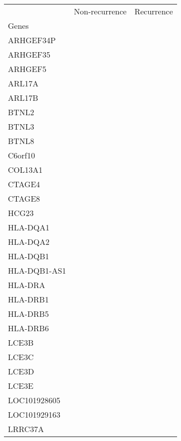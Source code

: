 \begin{tabular}{lcc}
\toprule
{} & Non-recurrence & Recurrence \\
Genes        &                &            \\
\midrule
ARHGEF34P    &                &            \\
ARHGEF35     &                &            \\
ARHGEF5      &                &            \\
ARL17A       &                &            \\
ARL17B       &                &            \\
BTNL2        &                &            \\
BTNL3        &                &            \\
BTNL8        &                &            \\
C6orf10      &                &            \\
COL13A1      &                &            \\
CTAGE4       &                &            \\
CTAGE8       &                &            \\
HCG23        &                &            \\
HLA-DQA1     &                &            \\
HLA-DQA2     &                &            \\
HLA-DQB1     &                &            \\
HLA-DQB1-AS1 &                &            \\
HLA-DRA      &                &            \\
HLA-DRB1     &                &            \\
HLA-DRB5     &                &            \\
HLA-DRB6     &                &            \\
LCE3B        &                &            \\
LCE3C        &                &            \\
LCE3D        &                &            \\
LCE3E        &                &            \\
LOC101928605 &                &            \\
LOC101929163 &                &            \\
LRRC37A      &                &            \\

\end{tabular}
